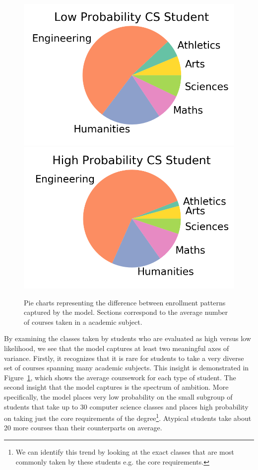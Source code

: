 \documentclass{edm_template}
\begin{document}
   
\begin{figure}
    \centering
    \includegraphics[scale=0.20]{figures/lowpie.png}
    \includegraphics[scale=0.20]{figures/highpie.png}
    \caption{Pie charts representing the difference between enrollment patterns captured by the model. Sections correspond to the average number of courses taken in a academic subject.}
    \label{fig:piecharts}
\end{figure}

By examining the classes taken by students who are evaluated as high versus low likelihood, we see that the model captures at least two meaningful axes of variance. Firstly, it recognizes that it is rare for students to take a very diverse set of courses spanning many academic subjects. This insight is demonstrated in Figure~\ref{fig:piecharts}, which shows the average coursework for each type of student. The second insight that the model captures is the spectrum of ambition. More specifically, the model places very low probability on the small subgroup of students that take up to 30 computer science classes and places high probability on taking just the core requirements of the degree\footnote{We can identify this trend by looking at the exact classes that are most commonly taken by these students e.g. the core requirements.}. Atypical students take about 20 more courses than their counterparts on average. 
\end{document}

